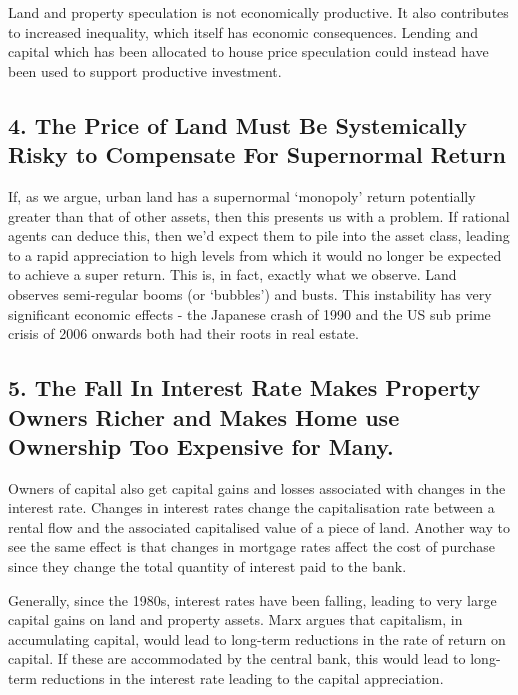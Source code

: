 \documentclass[]{tufte-handout}
\begin{document}
Land and property speculation is not economically productive. It also
contributes to increased inequality, which itself has economic
consequences. Lending and capital which has been allocated to house
price speculation could instead have been used to support productive
investment.

\hypertarget{the-price-of-land-must-be-systemically-risky-to-compensate-for-supernormal-return}{%
\subsection{4. The Price of Land Must Be Systemically Risky to
Compensate For Supernormal
Return}\label{the-price-of-land-must-be-systemically-risky-to-compensate-for-supernormal-return}}

If, as we argue, urban land has a supernormal `monopoly' return
potentially greater than that of other assets, then this presents us
with a problem. If rational agents can deduce this, then we'd expect
them to pile into the asset class, leading to a rapid appreciation to
high levels from which it would no longer be expected to achieve a super
return. This is, in fact, exactly what we observe. Land observes
semi-regular booms (or `bubbles') and busts. This instability has very
significant economic effects - the Japanese crash of 1990 and the US sub
prime crisis of 2006 onwards both had their roots in real estate.

\hypertarget{the-fall-in-interest-rate-makes-property-owners-richer-and-makes-home-use-ownership-too-expensive-for-many.}{%
\subsection{5. The Fall In Interest Rate Makes Property Owners Richer
and Makes Home use Ownership Too Expensive for
Many.}\label{the-fall-in-interest-rate-makes-property-owners-richer-and-makes-home-use-ownership-too-expensive-for-many.}}

Owners of capital also get capital gains and losses associated with
changes in the interest rate. Changes in interest rates change the
capitalisation rate between a rental flow and the associated capitalised
value of a piece of land. Another way to see the same effect is that
changes in mortgage rates affect the cost of purchase since they change
the total quantity of interest paid to the bank.

Generally, since the 1980s, interest rates have been falling, leading to
very large capital gains on land and property assets. Marx argues that
capitalism, in accumulating capital, would lead to long-term reductions
in the rate of return on capital. If these are accommodated by the
central bank, this would lead to long-term reductions in the interest
rate leading to the capital appreciation.
\end{document}
